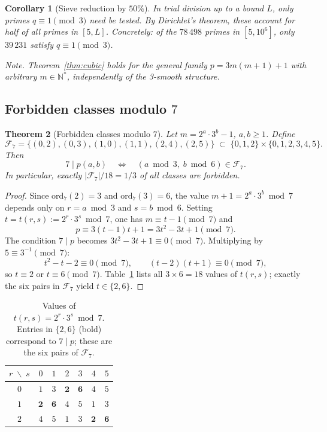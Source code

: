 \documentclass[11pt,a4paper]{article}
\newtheorem{theorem}{Theorem}[section]
\newtheorem{corollary}[theorem]{Corollary}
\theoremstyle{definition}
\theoremstyle{remark}
\newcommand{\N}{\mathbb{N}}
\newcommand{\F}{\mathcal{F}}
\begin{document}
\begin{corollary}[Sieve reduction by $50\%$]\label{cor:sieve-50}
In trial division up to a bound $L$, only primes $q\equiv 1\pmod{3}$ need
be tested. By Dirichlet's theorem, these account for half of all primes in
$[5,L]$. Concretely: of the $78\,498$ primes in $[5,10^6]$, only $39\,231$
satisfy $q\equiv 1\pmod{3}$.

\smallskip
\noindent\emph{Note.} Theorem~\ref{thm:cubic} holds for the general
family $p=3m(m+1)+1$ with arbitrary $m\in\N^*$, independently of the
3-smooth structure.
\end{corollary}

\subsection{Forbidden classes modulo $7$}

\begin{rigorousbox}
\begin{theorem}[Forbidden classes modulo $7$]\label{thm:mod7}
Let $m = 2^a\cdot 3^b-1$, $a,b\geq 1$. Define
\[
  \F_7 = \bigl\{(0,2),(0,3),(1,0),(1,1),(2,4),(2,5)\bigr\}
  \;\subset\; \{0,1,2\}\times\{0,1,2,3,4,5\}.
\]
Then
\[
  7\mid p(a,b)\quad\Longleftrightarrow\quad
  (a\bmod 3,\;b\bmod 6)\in\F_7.
\]
In particular, exactly $|\F_7|/18 = 1/3$ of all classes are forbidden.
\end{theorem}
\end{rigorousbox}

\begin{proof}
Since $\mathrm{ord}_7(2)=3$ and $\mathrm{ord}_7(3)=6$, the value
$m+1 = 2^a\cdot 3^b \bmod 7$ depends only on $r=a\bmod 3$ and
$s=b\bmod 6$. Setting $t = t(r,s):= 2^r\cdot 3^s\bmod 7$,
one has $m\equiv t-1\pmod{7}$ and
\[
  p \equiv 3(t-1)t+1 = 3t^2-3t+1\pmod{7}.
\]
The condition $7\mid p$ becomes $3t^2-3t+1\equiv 0\pmod{7}$.
Multiplying by $5\equiv 3^{-1}\pmod{7}$:
\[
  t^2-t-2\equiv 0\pmod{7},\qquad(t-2)(t+1)\equiv 0\pmod{7},
\]
so $t\equiv 2$ or $t\equiv 6\pmod{7}$. Table~\ref{tab:t-values} lists
all $3\times 6=18$ values of $t(r,s)$; exactly the six pairs in $\F_7$
yield $t\in\{2,6\}$.
\end{proof}

\begin{table}[ht]\centering
\caption{Values of $t(r,s)=2^r\cdot 3^s\bmod 7$.
Entries in $\{2,6\}$ (bold) correspond to $7\mid p$;
these are the six pairs of $\F_7$.}
\label{tab:t-values}
\begin{tabular}{@{}c|cccccc@{}}
\toprule
$r\;\backslash\; s$ & $0$ & $1$ & $2$ & $3$ & $4$ & $5$ \\
\midrule
$0$ & $1$ & $3$ & $\mathbf{2}$ & $\mathbf{6}$ & $4$ & $5$ \\
$1$ & $\mathbf{2}$ & $\mathbf{6}$ & $4$ & $5$ & $1$ & $3$ \\
$2$ & $4$ & $5$ & $1$ & $3$ & $\mathbf{2}$ & $\mathbf{6}$ \\
\bottomrule
\end{tabular}
\end{table}
\end{document}
